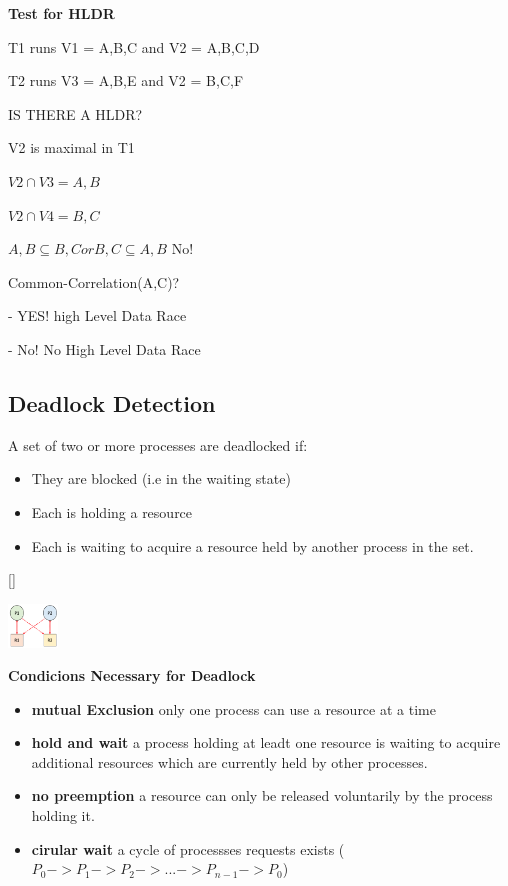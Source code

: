 \textbf{Test for HLDR}

T1 runs V1 = {A,B,C} and V2 = {A,B,C,D}\par
T2 runs V3 = {A,B,E} and V2 = {B,C,F}\par
IS THERE A HLDR?\par

V2 is maximal in T1\par
$V2 \cap V3 = {A,B}$\par
$V2 \cap V4 = {B,C}$\par
${A,B} \subseteq {B,C} or {B,C} \subseteq {A,B}$ No!\par
Common-Correlation(A,C)?\par
 - YES! high Level Data Race \par
 - No! No High Level Data Race

\subsection{Deadlock Detection}

A set of two or more processes are deadlocked if:\par
\begin{itemize}
    \item They are blocked (i.e in the waiting state)
    \item Each is holding a resource
    \item Each is waiting to acquire a resource held by another process in the set.
\end{itemize}[]

\includegraphics[width=0.1\textwidth]{ConcurrencyErrors/graphdeadlock.png}

\textbf{Condicions Necessary for Deadlock}\par
\begin{itemize}
    \item \textbf{mutual Exclusion} only one process can use a resource at a time
    \item \textbf{hold and wait} a process holding at leadt one resource is waiting to acquire additional resources which are currently held by other processes.
    \item \textbf{no preemption} a resource can only be released voluntarily by the process holding it.
    \item \textbf{cirular wait} a cycle of processses requests exists ($P_0 -> P_1 -> P_2 -> ... -> P_{n-1} -> P_0$)
\end{itemize}

